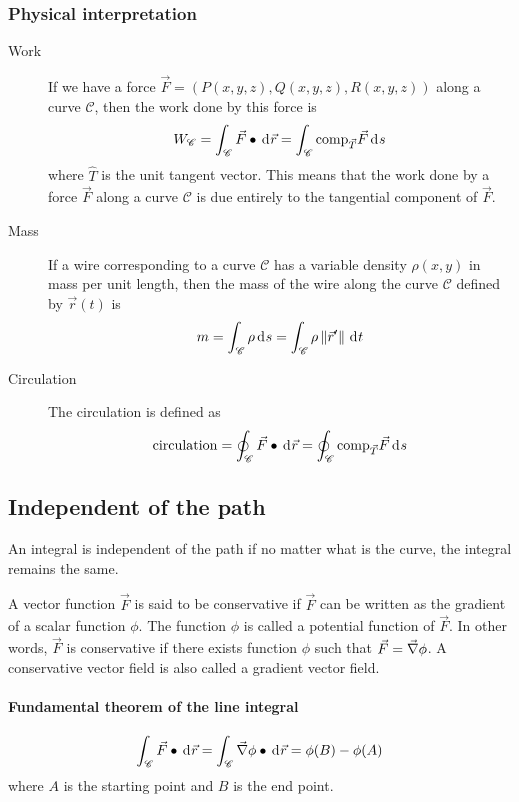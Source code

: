 \documentclass[10pt, twocolumn]{article}
\theoremstyle{remark}
\begin{document}
\subsubsection*{Physical interpretation}
\begin{description}
  \item[Work] If we have a force \(\vec{F} = \left( P(x, y, z), Q(x, y, z), R(x, y, z) \right)\) along a curve \(\mathscr{C}\), then the work done by this force is
        \[
          W_{\mathscr{C}} = \int_{\mathscr{C}}{\vec{F} \bullet \diffint{\vec{r}}} = \int_{\mathscr{C}}{\comp{F}{T} \diffint{s}}
        \]
        where \(\hat{T}\) is the unit tangent vector.
        This means that the work done by a force \(\vec{F}\) along a curve \(\mathscr{C}\) is due entirely to the tangential component of \(\vec{F}\).
  \item[Mass] If a wire corresponding to a curve \(\mathscr{C}\) has a variable density \(\rho(x, y)\) in mass per unit length, then the mass of the wire along the curve \(\mathscr{C}\) defined by \(\vec{r}(t)\) is
        \[
          m = \int_{\mathscr{C}}{\rho \diffint{s}} = \int_{\mathscr{C}}{\rho \norm{\vec{r}'} \diffint{t}}
        \]
  \item[Circulation] The circulation is defined as
        \[
          \mathrm{circulation} = \oint_{\mathscr{C}}{\vec{F} \bullet \diffint{\vec{r}}} = \oint_{\mathscr{C}}{\comp{F}{T} \diffint{s}}
        \]
\end{description}

\subsection{Independent of the path}
An integral is independent of the path if no matter what is the curve, the integral remains the same.

A vector function \(\vec{F}\) is said to be conservative if \(\vec{F}\) can be written as the gradient of a scalar function \(\phi\).
The function \(\phi\) is called a potential function of \(\vec{F}\).
In other words, \(\vec{F}\) is conservative if there exists function \(\phi\) such that \(\vec{F} = \grad{\phi}\).
A conservative vector field is also called a gradient vector field.

\paragraph*{Fundamental theorem of the line integral}
\[
  \int_{\mathscr{C}}{\vec{F} \bullet \diffint{\vec{r}}} = \int_{\mathscr{C}}{\grad{\phi} \bullet \diffint{\vec{r}}} = \phi(B) - \phi(A)
\]
where \(A\) is the starting point and \(B\) is the end point.
\end{document}
